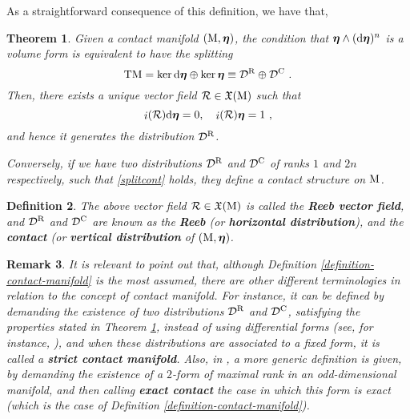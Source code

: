 \documentclass[12pt]{report}
\newtheorem{teor}{Theorem}[chapter]
\newtheorem{definition}[teor]{Definition}
\newtheorem{remark}[teor]{Remark}
\def\beq{\begin{equation}}
\def\eeq{\end{equation}}
\def\vf{\mathfrak X}
\def\d{{\rm d}}
\def\bmeta{\mbox{\boldmath $\eta$}}
\def\Tan{{\rm T}}
\def\inn{\mathop{i}\nolimits}
\newcommand{\Reeb}{\mathcal{R}}
\begin{document}
As a straightforward consequence of this definition, we have that, 

\begin{teor}
\label{1stprop}
Given a contact manifold $({\rm M},\bmeta)$,
the condition that $\bmeta\wedge(\d\bmeta)^{n}$ is a volume form
is equivalent to have the splitting 
\beq
\label{splitcont}
\Tan {\rm M} =\ker\d\bmeta\oplus\ker\bmeta\equiv\mathcal{D}^{\rm R}\oplus\mathcal{D}^{\rm C} \ . 
\eeq
Then, there exists a unique vector field $\Reeb\in\vf({\rm M})$ such that
\begin{equation}
\label{eq-Reeb}
\inn(\Reeb)\d\bmeta = 0,\quad
\inn(\Reeb)\bmeta = 1 \ ,
\end{equation}
and hence it generates the distribution ${\cal D}^{\rm R}$.

Conversely, if we have two distributions ${\cal D}^{\rm R}$ and ${\cal D}^{\rm C}$
of ranks $1$ and $2n$ respectively, such that
\eqref{splitcont} holds, they define a contact structure on ${\rm M}$.
\end{teor}

\begin{definition}
The above vector field $\Reeb\in\vf({\rm M})$
is called the {\sl \textbf{Reeb vector field}},
and ${\cal D}^{\rm R}$ and $\mathcal{D}^{\rm C}$
are known as the {\sl \textbf{Reeb}} (or {\sl \textbf{horizontal distribution}}\/),
and the {\sl \textbf{contact}} (or {\sl \textbf{vertical distribution}} of $({\rm M},\bmeta)$.
\end{definition}

\begin{remark}{\rm
It is relevant to point out that, although Definition \ref{definition-contact-manifold} is the most assumed,
there are other different terminologies in relation to the concept of {\sl contact manifold}.
For instance, it can be defined by demanding the existence of two distributions
${\cal D}^{\rm R}$ and $\mathcal{D}^{\rm C}$, satisfying the properties stated in Theorem \ref{1stprop}, instead of using differential forms 
(see, for instance, \cite{Ar-89,Geiges-2008,GG-2022,KA-2013}),
and when these distributions are associated to a fixed form,
it is called a {\sl \textbf{strict contact manifold}}.
Also, in \cite{AM-78}, a more generic definition is given,
by demanding the existence of a $2$-form of maximal rank in an odd-dimensional manifold, 
and then calling {\sl \textbf{exact contact}} the case in which this form is exact
(which is the case of Definition \ref{definition-contact-manifold}).
}\end{remark}
\end{document}
